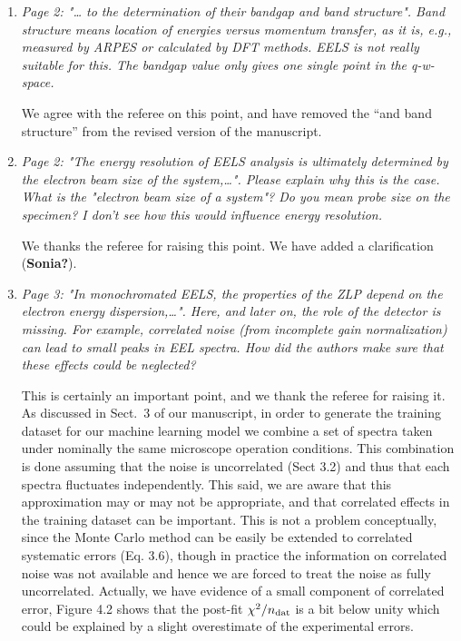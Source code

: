 \documentclass[12pt]{article}
\begin{document}
\begin{enumerate}

\item {\it Page 2: "… to the determination of their bandgap and band structure". Band structure means location of energies versus momentum transfer, as it is, e.g., measured by ARPES or calculated by DFT methods. EELS is not really suitable for this. The bandgap value only gives one single point in the q-w-space.}

  We agree with the referee on this point, and have removed the ``and band structure'' from the revised version
  of the manuscript.
  
\item	{\it Page 2: "The energy resolution of EELS analysis is ultimately determined by the electron beam size of the system,…". Please explain why this is the case. What is the "electron beam size of a system"? Do you mean probe size on the specimen? I don't see how this would influence energy resolution.}

  We thanks the referee for raising this point. We have added a clarification ({\bf Sonia?}).

\item {\it Page 3: "In monochromated EELS, the properties of the ZLP depend on the electron energy dispersion,…". Here, and later on, the role of the detector is missing. For example, correlated noise (from incomplete gain normalization) can lead to small peaks in EEL spectra. How did the authors make sure that these effects could be neglected?}

  This is certainly an important point, and we thank the referee for raising it.
  As discussed in Sect.~3 of our manuscript, in order to generate the training dataset
  for our machine learning model we combine a set of spectra taken under nominally the
  same microscope operation conditions.
  This combination is done assuming that the noise is uncorrelated (Sect 3.2) and thus
  that each spectra fluctuates independently.
  This said, we are aware that this approximation may or may not be appropriate,
  and that correlated effects in the training dataset can be important.
  This is not a problem conceptually, since the Monte Carlo method can be easily
  be extended to correlated systematic errors (Eq. 3.6), though in practice the information
  on correlated noise was not available and hence we are forced to treat the noise
  as fully uncorrelated.
  Actually, we have evidence of a small component of correlated error, Figure 4.2 shows
  that the post-fit $\chi^2/n_{\rm dat}$ is a bit below unity which could be explained
  by a slight overestimate of the experimental errors.


\end{enumerate}
\end{document}
